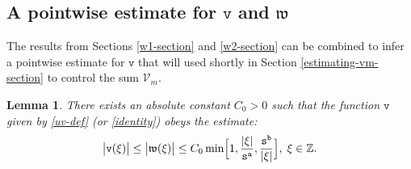 \documentclass[12pt, twoside]{article}
\newtheorem{lemma}[theorem]{Lemma}
\theoremstyle{definition}
\numberwithin{equation}{section}
\begin{document}
\subsection{A pointwise estimate for $\mathtt v$ and $\mathfrak w$} \label{w-pointwise-section}  
The results from Sections \ref{w1-section} and \ref{w2-section} can be combined to infer a pointwise estimate for $\mathtt v$ that will used shortly in Section \ref{estimating-vm-section} to control the sum $\mathcal V_m$. 
\begin{lemma} \label{v-lemma} 
There exists an absolute constant $C_0 > 0$ such that the function $\mathtt v$ given by \eqref{uv-def} (or \eqref{identity}) obeys the estimate:
\begin{equation} \label{v-pointwise-estimate}
\bigl| \mathtt v(\xi) \bigr| \leq \bigl|\mathfrak w(\xi) \bigr| 
\leq C_0 \min \Bigl[1, \frac{|\xi|}{\mathtt s^{\mathtt a}}, \frac{\mathtt s^{\mathtt b}}{|\xi|}\Bigr],\; \xi\in\mathbb{Z}.
\end{equation}  
\end{lemma} 
\end{document}

